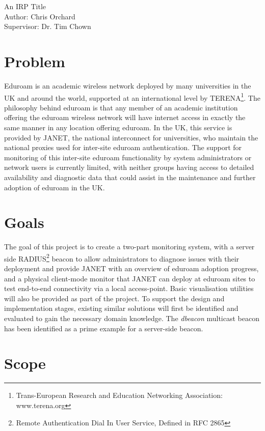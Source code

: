 \documentclass[pdflatex, a4paper,12pt]{article}
\begin{document}
\begin{center}
{\LARGE An IRP Title}\\[1em]

Author: Chris Orchard\\
Supervisor: Dr. Tim Chown
\end{center}

\section{Problem}


Eduroam is an academic wireless network deployed by many universities in the UK
and around the world, supported at an international level by
TERENA\footnote[1]{Trans-European Research and Education Networking Association:
www.terena.org}. The philosophy behind eduroam
is that any member of an academic
institution offering the eduroam wireless network will have internet access in
exactly the same manner in any location offering eduroam. In the UK, this
service is provided by JANET, the national interconnect for
universities, who maintain the national proxies used for inter-site eduroam
authentication. The support for monitoring of this inter-site eduroam functionality by system administrators or network
users is currently limited, with neither groups having access to detailed
availability and diagnostic data that could assist in the maintenance and
further adoption of eduroam in the UK.

\section{Goals}

The goal of this project is to create a two-part monitoring system, with a
server side RADIUS\footnote[2]{Remote Authentication Dial In User Service,
Defined in RFC
2865} beacon to allow administrators to diagnose issues with their
deployment and provide JANET with an overview of eduroam adoption progress, and
a physical client-mode monitor that JANET can deploy at eduroam sites to test
end-to-end connectivity via a local access-point. Basic visualisation utilities will
also be provided as part of the project. To support the design and implementation
stages, existing similar solutions will first be identified and evaluated to
gain the necessary domain knowledge. The \emph{dbeacon} multicast beacon has been identified
as a prime example for a server-side beacon.
 
\section{Scope}
\end{document}
